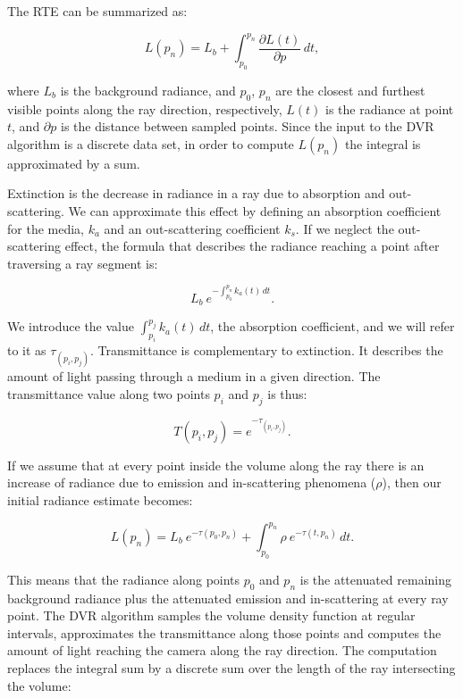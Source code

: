The RTE can be summarized as:

\begin{equation} \label{eq:general_radiance}  
  L(p_n) = L_b + \int_{p_0}^{p_n} \frac{\partial L(t)}{\partial p} \, dt,
\end{equation}

\noindent where $L_b$ is the background radiance, and $p_0$, $p_n$ are the closest and furthest visible points along the ray direction, respectively, $L(t)$ is the radiance at point $t$, and $\partial p$ is the distance between sampled points. 
Since the input to the DVR algorithm is a discrete data set, in order to compute $L(p_n)$ the integral is approximated by a sum.

Extinction is the decrease in radiance in a ray due to absorption and out-scattering.
We can approximate this effect by defining an absorption coefficient for the media, $k_a$ and an out-scattering coefficient $k_s$. 
If we neglect the out-scattering effect, the formula that describes the radiance reaching a point after traversing a ray segment is:

\begin{equation} \label{eq:radiance_absorption}  
    L_b \ e^{- \textstyle  \int_{p_0}^{p_n} k_a(t) \, dt}.
\end{equation}

We introduce the value $\int_{p_i}^{p_j} k_a(t) \, dt$, the absorption coefficient, and we will refer to it as $\tau_{(p_i, p_j)}$. 
Transmittance is complementary to extinction. It describes the amount of light passing through a medium in a given direction. 
The transmittance value along two points $p_i$ and $p_j$ is thus:

\begin{equation} \label{eq:transmittance}  
  T(p_i,p_j) = e^{- \textstyle \tau_{(p_i, p_j)}}.
\end{equation}

If we assume that at every point inside the volume along the ray there is an increase of radiance due to emission and in-scattering phenomena ($\rho$), then our initial radiance estimate becomes:

\begin{equation} \label{eq:ray_radiance}  
  L(p_n) = L_b \ e^{-\tau(p_0, p_n)} + \int_{p_0}^{p_n} \rho \ e^{-\tau(t,p_n)} \, dt.
\end{equation}


This means that the radiance along points $p_0$ and $p_n$ is the attenuated remaining background radiance plus the attenuated emission and in-scattering at every ray point.
The DVR algorithm samples the volume density function at regular intervals, approximates the transmittance along those points and computes the amount of light reaching the camera along the ray direction.
The computation replaces the integral sum by a discrete sum over the length of the ray intersecting the volume:

